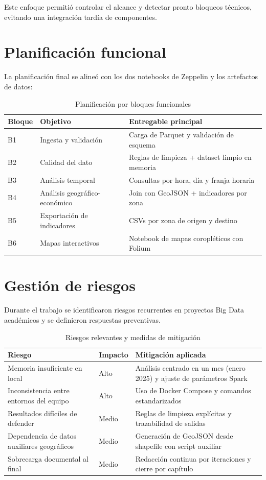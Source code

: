 Este enfoque permitió controlar el alcance y detectar pronto bloqueos técnicos,
evitando una integración tardía de componentes.

\section{Planificación funcional}
La planificación final se alineó con los dos notebooks de Zeppelin y los
artefactos de datos:

\begin{table}[H]
	\centering
	\caption{Planificación por bloques funcionales}
	\begin{tabular}{|p{2.3cm}|p{4.7cm}|p{6.4cm}|}
		\hline
		\textbf{Bloque} & \textbf{Objetivo} & \textbf{Entregable principal} \\
		\hline
		B1 & Ingesta y validación & Carga de Parquet y validación de esquema \\
		\hline
		B2 & Calidad del dato & Reglas de limpieza + dataset limpio en memoria \\
		\hline
		B3 & Análisis temporal & Consultas por hora, día y franja horaria \\
		\hline
		B4 & Análisis geográfico-económico & Join con GeoJSON + indicadores por zona \\
		\hline
		B5 & Exportación de indicadores & CSVs por zona de origen y destino \\
		\hline
		B6 & Mapas interactivos & Notebook de mapas coropléticos con Folium \\
		\hline
	\end{tabular}
\end{table}

\section{Gestión de riesgos}
Durante el trabajo se identificaron riesgos recurrentes en proyectos Big Data
académicos y se definieron respuestas preventivas.

\begin{table}[H]
	\centering
	\caption{Riesgos relevantes y medidas de mitigación}
	\begin{tabular}{|p{4.0cm}|p{3.2cm}|p{6.2cm}|}
		\hline
		\textbf{Riesgo} & \textbf{Impacto} & \textbf{Mitigación aplicada} \\
		\hline
		Memoria insuficiente en local & Alto & Análisis centrado en un mes (enero 2025) y ajuste de parámetros Spark \\
		\hline
		Inconsistencia entre entornos del equipo & Alto & Uso de Docker Compose y comandos estandarizados \\
		\hline
		Resultados difíciles de defender & Medio & Reglas de limpieza explícitas y trazabilidad de salidas \\
		\hline
		Dependencia de datos auxiliares geográficos & Medio & Generación de GeoJSON desde shapefile con script auxiliar \\
		\hline
		Sobrecarga documental al final & Medio & Redacción continua por iteraciones y cierre por capítulo \\
		\hline
	\end{tabular}
\end{table}

